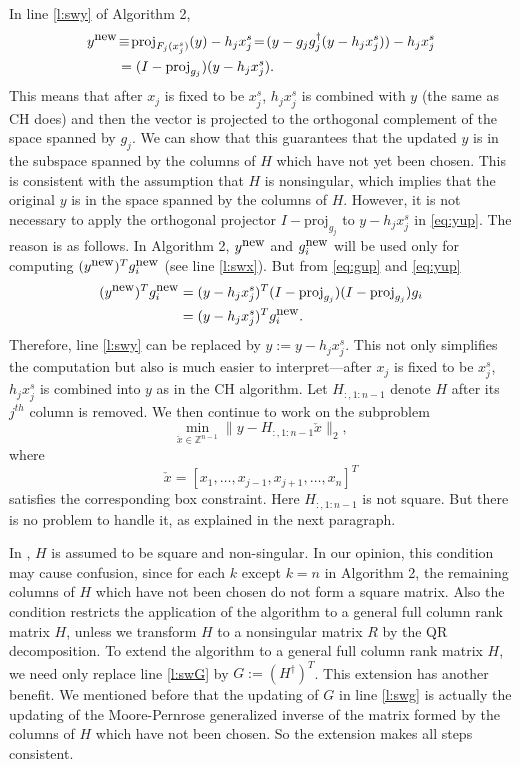 \documentclass[12pt,Bold,letterpaper]{mcgilletdclass}
\newcommand{\be}{\begin{equation}}
\newcommand{\ee}{\end{equation}}
\begin{document}
In line \ref{l:swy} of Algorithm 2,
\begin{align}
y^{\small \mbox{new}} & \!\equiv\! \mbox{proj}_{F_j(x_j^s)}(y) - h_jx_j^s 
 \!=\! (y -  g_jg_j^\dag(y-h_jx_j^s)) - h_jx_j^s  \nonumber \\
   &=  (I-\mbox{proj}_{g_j})(y-h_jx_j^s). \label{eq:yup}  
\end{align}
This means that after $x_j$ is fixed to be $x_j^s$, $h_jx_j^s$ is combined with $y$ (the same
as CH does)  and then the vector is projected to the orthogonal complement of 
the space spanned by $g_j$. 
We can show that this guarantees that the updated $y$ is in the subspace spanned by
the columns of $H$ which have not yet been chosen.
This is consistent with the assumption that $H$ is nonsingular, which implies that 
the original $y$  is in the space spanned by  the columns of $H$.
However, it is not necessary to apply the orthogonal projector $I- \mbox{proj}_{g_j}$ to $y-h_jx_j^s$ in \eqref{eq:yup}.
The reason is as follows. 
In Algorithm 2, $y^{\small \mbox{new}}$ and $g_i^{\small \mbox{new}}$ will be used only for computing 
$(y^{\small \mbox{new}})^Tg_i^{\small \mbox{new}}$ (see line \ref{l:swx}).
But from \eqref{eq:gup} and \eqref{eq:yup}
\begin{align*}
(y^{\small \mbox{new}})^Tg_i^{\small \mbox{new}}
& =(y-h_jx_j^s)^T(I-\mbox{proj}_{g_j})(I-\mbox{proj}_{g_j})g_i \\
&=(y-h_jx_j^s)^Tg_i^{\small \mbox{new}}.
\end{align*}
Therefore, line \ref{l:swy} can be replaced by $y:=y-h_jx_j^s$.
This not only simplifies the computation but also is much easier to interpret---after $x_j$ is fixed to be $x_j^s$,  
$h_jx_j^s$ is combined into $y$ as in the CH algorithm.
Let $H_{:,1:n-1}$ denote $H$ after its $j^{th}$ column is removed. 
We then continue to work on the subproblem
\be
\min_{\check{x}\in \mathbb{Z}^{n-1}}\|y-H_{:,1:n-1}\check{x}\|_2, 
\label{eq:subs}
\ee
where $$\check{x}=[x_1,\ldots,x_{j-1},x_{j+1},\ldots,x_n]^T$$ 
satisfies the corresponding box constraint.
Here $H_{:,1:n-1}$ is not square. But there is no problem to handle
it, as explained in the next paragraph.

In \cite{SuW05},  $H$ is assumed to be square and non-singular. 
In our opinion, this condition may cause confusion,
since for each $k$ except $k=n$ in Algorithm 2, 
the remaining columns of $H$ which have not been chosen do not form a square matrix.
Also the condition restricts the application of the algorithm to a general full column rank matrix $H$,
unless we transform $H$ to a nonsingular matrix $R$ by the QR decomposition.
To extend the algorithm to a general full column rank matrix $H$, we need only 
replace line \ref{l:swG} by $G:=(H^{\dagger})^T$.
This extension has another benefit. 
We mentioned before that the updating of $G$ in line \ref{l:swg}
is actually the updating of the Moore-Pernrose generalized inverse 
of the matrix formed by the columns of $H$ which have not been chosen. 
So the extension makes all steps consistent.
\end{document}
